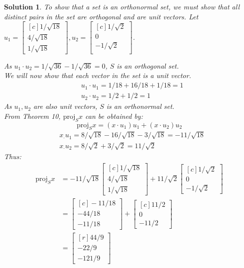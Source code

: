 \documentclass[11pt]{scrartcl}
\theoremstyle{dotlessP}
\newtheorem{sol}{Solution}[section]
\theoremstyle{dotlessN}
\newcommand{\proj}[2]{\text{proj}_{#1}{#2}}
\begin{document}
\begin{sol}
	To show that a set is an orthonormal set, we must show that all distinct pairs in the set are orthogonal and are unit vectors. Let $u_1 = 
	\begin{bmatrix}[c]
	1/\sqrt{18} \\
	4/\sqrt{18} \\
	1/\sqrt{18}
\end{bmatrix},
u_2 = 
\begin{bmatrix}[c]
	1/\sqrt{2} \\
	0 \\
	-1/\sqrt{2} \\
\end{bmatrix}
	$.

	As $u_1 \cdot u_2 = 1/\sqrt{36} - 1/\sqrt{36} = 0$, $S$ is an orthogonal set. 
\\

	We will now show that each vector in the set is a unit vector.
	\begin{align*}
		&u_1 \cdot u_1 = 1/18 + 16/18 + 1/18 = 1 \\
		&u_2 \cdot u_2 = 1/2 + 1/2 = 1
	\end{align*}
	As $u_1,u_2$ are also unit vectors, $S$ is an orthonormal set.
	\\

	From Theorem 10, $\proj{S}{x}$ can be obtained by:
	\[
		\proj{S}{x} = (x \cdot u_1)u_1 + (x \cdot u_2)u_2
	\] 
	\begin{align*}
		&x_\cdot u_1 = 8/\sqrt{18} - 16/\sqrt{18} - 3/\sqrt{18} = -11/\sqrt{18}\\
		&x_ \cdot u_2 = 8/\sqrt{2} + 3/\sqrt{2} = 11/\sqrt{2}
	\end{align*}
	Thus:
	\begin{align*}
		\proj{S}{x} &= -11/\sqrt{18}
		\begin{bmatrix}[c]
			1/\sqrt{18} \\
			4/\sqrt{18} \\
			1/\sqrt{18}
		\end{bmatrix} + 11/\sqrt{2} 
		\begin{bmatrix}[c]
			1/\sqrt{2} \\
			0 \\
			-1/\sqrt{2}
		\end{bmatrix} \\
					&=
					\begin{bmatrix}[c]
						-11/18 \\
						-44/18 \\
						-11/18
					\end{bmatrix} + 
					\begin{bmatrix}[c]
						11/2 \\
						0 \\
						-11/2
					\end{bmatrix} \\
					&= 
					\begin{bmatrix}[r]
						44/9 \\
						-22/9 \\
						-121/9
					\end{bmatrix}
	\end{align*}
\end{sol}
\end{document}
